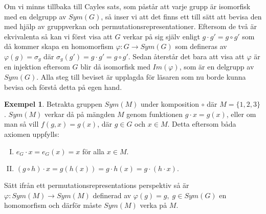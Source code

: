 \documentclass{article}
\theoremstyle{definition}
\newtheorem{exmp}[thm]{Exempel}
\begin{document}
Om vi minns tillbaka till Cayles sats, som påstår att varje grupp är isomorfisk med en delgrupp
av $Sym(G)$, så inser vi att det finns ett till sätt att bevisa den med hjälp av 
gruppverkan och permutationsrepresentationer. Eftersom de två är ekvivalenta så kan vi 
först visa att $G$ verkar på sig själv enligt $g \cdot g' = g \circ g'$ 
som då kommer skapa en homomorfism
$\varphi: G \rightarrow Sym(G)$ som defineras av $\varphi(g) = \sigma_g$
där $\sigma_g(g') = g \cdot g' = g \circ g'$. Sedan återstår det 
bara att visa att $\varphi$ är en injektion eftersom $G$ blir då isomorfisk med $Im(\varphi)$, 
som är en delgrupp av $Sym(G)$. Alla steg till beviset är upplagda för läsaren som nu 
borde kunna bevisa och förstå detta på egen hand. 




\begin{exmp}
  Betrakta gruppen $Sym(M)$ under komposition $\circ$ där 
  $M = \{1, 2, 3\}$. $Sym(M)$ verkar då på mängden $M$
  genom funktionen $g \cdot x = g(x)$, eller om man så vill $f(g, x) = g(x)$, 
  där $g \in G$ och $x \in M$. Detta eftersom båda axiomen uppfylls:
  \begin{enumerate}[I)]
    \item $e_G \cdot x = e_G(x) = x$ för alla $x \in M$.
    \item $(g \circ h) \cdot x = g(h(x)) = g \cdot h(x) = g \cdot (h \cdot x).$
  \end{enumerate}
  Sätt ifrån ett permutationsrepresentations perspektiv så är 
  $\varphi: Sym(M) \rightarrow Sym(M)$ definerad av $\varphi(g) = g, \; g \in Sym(G)$
  en homomorfism och därför måste $Sym(M)$ verka på $M$.
\end{exmp}
\end{document}
